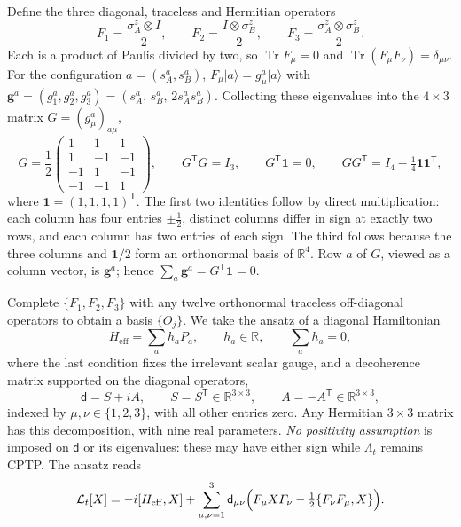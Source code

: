 \documentclass[11pt,a4paper]{article}
\newcommand{\ket}[1]{\lvert #1\rangle}
\newcommand{\Tr}{\operatorname{Tr}}
\newcommand{\dmat}{\mathsf d}
\newcommand{\Heff}{H_{\mathrm{eff}}}
\begin{document}
Define the three diagonal, traceless and Hermitian operators
\begin{equation}
 F_1=\frac{\sigma_A^z\otimes I}{2},\qquad
 F_2=\frac{I\otimes\sigma_B^z}{2},\qquad
 F_3=\frac{\sigma_A^z\otimes\sigma_B^z}{2}.
 \label{eq:diagonalbasis}
\end{equation}
Each is a product of Paulis divided by two, so
$\Tr F_\mu=0$ and $\Tr(F_\mu F_\nu)=\delta_{\mu\nu}$. For the configuration
$a=(s_A^a,s_B^a)$, $F_\mu\ket a=g_\mu^a\ket a$ with
$\mathbf g^a=(g_1^a,g_2^a,g_3^a)=(s_A^a,\,s_B^a,\,2s_A^as_B^a)$. Collecting
these eigenvalues into the $4\times3$ matrix $G=(g_\mu^a)_{a\mu}$,
\begin{equation}
 G=\frac12\begin{pmatrix}
 1&1&1\\ 1&-1&-1\\ -1&1&-1\\ -1&-1&1
 \end{pmatrix},
 \qquad
 \boxed{G^{\mathsf T}G=I_3,\qquad
 G^{\mathsf T}\mathbf1=0,\qquad
 GG^{\mathsf T}=I_4-\tfrac14\mathbf1\mathbf1^{\mathsf T},}
 \label{eq:Gmatrix}
\end{equation}
where $\mathbf1=(1,1,1,1)^{\mathsf T}$. The first two identities follow
by direct multiplication: each column has four entries $\pm\frac12$,
distinct columns differ in sign at exactly two rows, and each column has
two entries of each sign. The third follows because the three columns
and $\mathbf1/2$ form an orthonormal basis of $\mathbb R^4$. Row $a$ of
$G$, viewed as a column vector, is $\mathbf g^a$; hence
$\sum_a\mathbf g^a=G^{\mathsf T}\mathbf1=0$.

Complete $\{F_1,F_2,F_3\}$ with any twelve orthonormal traceless
off-diagonal operators to obtain a basis $\{O_j\}$. We take the ansatz
of a diagonal Hamiltonian
\begin{equation}
 \Heff=\sum_ah_aP_a,\qquad h_a\in\mathbb R,\qquad \sum_ah_a=0,
\end{equation}
where the last condition fixes the irrelevant scalar gauge, and a
decoherence matrix supported on the diagonal operators,
\begin{equation}
 \dmat=S+iA,\qquad S=S^{\mathsf T}\in\mathbb R^{3\times3},\qquad
 A=-A^{\mathsf T}\in\mathbb R^{3\times3},
 \label{eq:dsplit}
\end{equation}
indexed by $\mu,\nu\in\{1,2,3\}$, with all other entries zero. Any
Hermitian $3\times3$ matrix has this decomposition, with nine real
parameters. \emph{No positivity assumption} is imposed on $\dmat$ or its
eigenvalues: these may have either sign while $\Lambda_t$ remains CPTP.
The ansatz reads
\begin{equation}
 \mathcal L_t[X]=-i[\Heff,X]+
 \sum_{\mu,\nu=1}^{3}\dmat_{\mu\nu}
 \Bigl(F_\mu XF_\nu-\tfrac12\{F_\nu F_\mu,X\}\Bigr).
 \label{eq:ansatz}
\end{equation}
\end{document}
